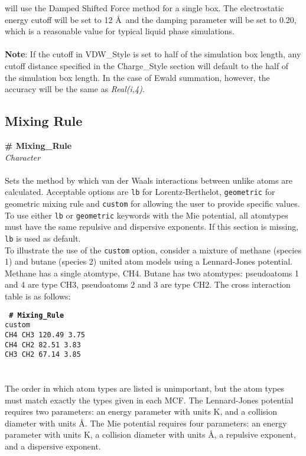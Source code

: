 will use the Damped Shifted Force method for a single box. The electrostatic
energy cutoff will be set to 12 \AA\ and the damping parameter will be set
to 0.20, which is a reasonable value for
typical liquid phase simulations. \\  \\
%
{\bf{Note}}: If the cutoff in VDW\_Style is set to half of the
simulation box length, any cutoff distance specified in the
Charge\_Style section will default to the half of the simulation box
length. In the case of Ewald summation, however, the accuracy will be
the same as {\it Real(i,4)}.
%
%
%
\subsection{Mixing Rule}\label{Mixing_Rule}
{\bf \# Mixing\_Rule} \\
{\it Character} \\ \\
%
Sets the method by which van der Waals interactions between unlike atoms are calculated.
Acceptable options are \texttt{lb} for Lorentz-Berthelot,
\texttt{geometric} for geometric mixing rule
and \texttt{custom} for allowing the user to provide specific values.
To use either \texttt{lb} or \texttt{geometric} keywords with the Mie potential,
all atomtypes must have the same repulsive and dispersive exponents.
If this section is missing, \texttt{lb} is used as default. \\

To illustrate the use of the \texttt{custom} option, consider a mixture of methane (species 1)
and butane (species 2) united atom models using a Lennard-Jones potential.
Methane has a single atomtype, CH4.
Butane has two atomtypes: pseudoatoms 1 and 4 are type CH3, pseudoatoms 2 and 3 are type CH2.
The cross interaction table is as follows:

\texttt{
{\bf \# Mixing\_Rule} \\
custom\\
CH4  CH3  120.49   3.75\\
CH4  CH2   82.51   3.83\\
CH3  CH2   67.14   3.85\\
}
\\ \\
The order in which atom types are listed is unimportant,
but the atom types must match exactly the types given in each MCF.
The Lennard-Jones potential requires two parameters:
an energy parameter with units K, and a collision diameter with units \AA.
The Mie potential requires four parameters:
an energy parameter with units K, a collision diameter with units \AA,
a repulsive exponent, and a dispersive exponent.

